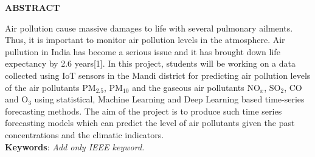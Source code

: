 \begin{center}
{\Large \bf ABSTRACT}
\end{center}
\noindent
Air pollution cause massive damages to life with several pulmonary ailments. Thus,
it is important to monitor air pollution levels in the atmosphere. Air pullution in India has become a serious issue and it has brought down life expectancy by 2.6 years[1].      In this project,
students will be working on a data collected using IoT sensors in the Mandi district
for predicting air pollution levels of the air pollutants PM$_{2.5}$, PM$_{10}$ and the gaseous air pollutants NO$_{x}$, SO$_{2}$, CO and O$_{3}$  using
statistical, Machine Learning and Deep Learning based time-series forecasting methods. The  aim of the project is to produce such time series forecasting models which can predict the level of air pollutants given the past concentrations and the climatic indicators.
\\{\bf Keywords}:
{\it Add only IEEE keyword.}
\newpage
\clearpage 
